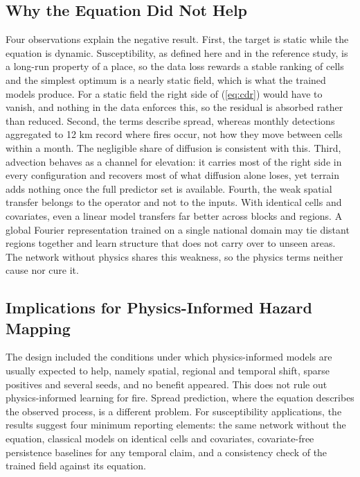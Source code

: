 \documentclass[journal]{IEEEtran}
\begin{document}
\subsection{Why the Equation Did Not Help}
Four observations explain the negative result. First, the target is static while the equation is dynamic. Susceptibility, as defined here and in the reference study, is a long-run property of a place, so the data loss rewards a stable ranking of cells and the simplest optimum is a nearly static field, which is what the trained models produce. For a static field the right side of (\ref{eq:cdr}) would have to vanish, and nothing in the data enforces this, so the residual is absorbed rather than reduced. Second, the terms describe spread, whereas monthly detections aggregated to 12 km record where fires occur, not how they move between cells within a month. The negligible share of diffusion is consistent with this. Third, advection behaves as a channel for elevation: it carries most of the right side in every configuration and recovers most of what diffusion alone loses, yet terrain adds nothing once the full predictor set is available. Fourth, the weak spatial transfer belongs to the operator and not to the inputs. With identical cells and covariates, even a linear model transfers far better across blocks and regions. A global Fourier representation trained on a single national domain may tie distant regions together and learn structure that does not carry over to unseen areas. The network without physics shares this weakness, so the physics terms neither cause nor cure it.

\subsection{Implications for Physics-Informed Hazard Mapping}
The design included the conditions under which physics-informed models are usually expected to help, namely spatial, regional and temporal shift, sparse positives and several seeds, and no benefit appeared. This does not rule out physics-informed learning for fire. Spread prediction, where the equation describes the observed process, is a different problem. For susceptibility applications, the results suggest four minimum reporting elements: the same network without the equation, classical models on identical cells and covariates, covariate-free persistence baselines for any temporal claim, and a consistency check of the trained field against its equation.
\end{document}

